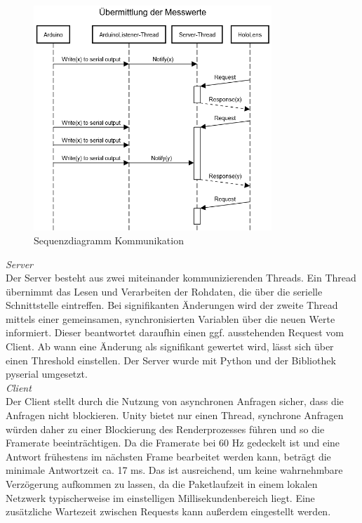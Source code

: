 \begin{figure}[H]
	\centering
	\includegraphics[width=0.8\textwidth]{images/schema/Sequenzdiagramm.png}
	\caption{Sequenzdiagramm Kommunikation}
	\label{img:Sequenzdiagramm}
\end{figure}

\textit{Server}\\
Der Server besteht aus zwei miteinander kommunizierenden Threads. Ein Thread übernimmt das Lesen und Verarbeiten der Rohdaten, die über die serielle Schnittstelle eintreffen. Bei signifikanten Änderungen wird der zweite Thread mittels einer gemeinsamen, synchronisierten Variablen über die neuen Werte informiert. Dieser beantwortet daraufhin einen ggf. ausstehenden Request vom Client. Ab wann eine Änderung als signifikant gewertet wird, lässt sich über einen Threshold einstellen. Der Server wurde mit Python und der Bibliothek pyserial umgesetzt.\\

\textit{Client}\\
Der Client stellt durch die Nutzung von asynchronen Anfragen sicher, dass die Anfragen nicht blockieren. Unity bietet nur einen Thread, synchrone Anfragen würden daher zu einer Blockierung des Renderprozesses führen und so die Framerate beeinträchtigen. Da die Framerate bei 60 Hz gedeckelt ist und eine Antwort frühestens im nächsten Frame bearbeitet werden kann, beträgt die minimale Antwortzeit ca. 17 ms. Das ist ausreichend, um keine wahrnehmbare Verzögerung aufkommen zu lassen, da die Paketlaufzeit in einem lokalen Netzwerk typischerweise im einstelligen Millisekundenbereich liegt. Eine zusätzliche Wartezeit zwischen Requests kann außerdem eingestellt werden.\\

